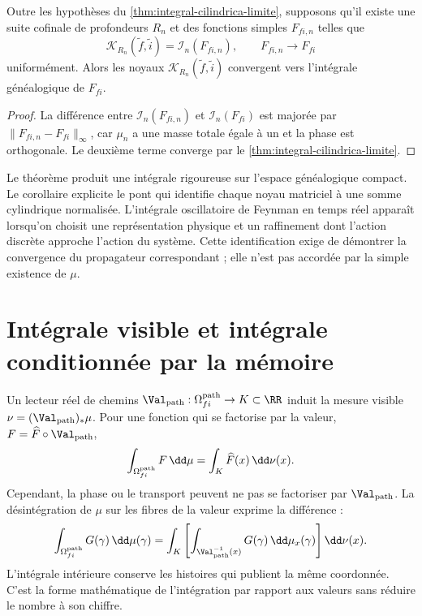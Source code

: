 \begin{corollary}
\label{cor:convergencia-kernels-discretos}
Outre les hypothèses du
\cref{thm:integral-cilindrica-limite}, supposons qu'il existe une suite
cofinale de profondeurs \(R_n\) et des fonctions simples \(F_{fi,n}\) telles que
\[
 \mathcal K_{R_n}(\widetilde f,\widetilde i)
 =\mathcal I_n(F_{fi,n}),
 \qquad
 F_{fi,n}\longrightarrow F_{fi}
\]
uniformément. Alors les noyaux
\(\mathcal K_{R_n}(\widetilde f,\widetilde i)\) convergent vers l'intégrale
généalogique de \(F_{fi}\).
\end{corollary}

\begin{proof}
La différence entre \(\mathcal I_n(F_{fi,n})\) et
\(\mathcal I_n(F_{fi})\) est majorée par
\(\|F_{fi,n}-F_{fi}\|_\infty\), car \(\mu_n\) a une masse totale égale à un et la
phase est orthogonale. Le deuxième terme converge par le
\cref{thm:integral-cilindrica-limite}.
\end{proof}

Le théorème produit une intégrale rigoureuse sur l'espace généalogique
compact. Le corollaire explicite le pont qui identifie chaque noyau
matriciel à une somme cylindrique normalisée. L'intégrale oscillatoire de
Feynman en temps réel apparaît lorsqu'on choisit
une représentation physique et un raffinement dont l'action discrète approche
l'action du système. Cette identification exige de démontrer la convergence du
propagateur correspondant ; elle n'est pas accordée par la simple existence de
\(\mu\).

\section{Intégrale visible et intégrale conditionnée par la mémoire}

Un lecteur réel de chemins
\(\Val_{\rm path}:\Omega_{fi}^{\rm path}\to K\subset\RR\) induit la mesure
visible \(\nu=(\Val_{\rm path})_*\mu\). Pour une fonction qui se factorise par la
valeur, \(F=\widehat F\circ\Val_{\rm path}\),
\[
 \int_{\Omega_{fi}^{\rm path}}F\,\dd\mu
 =\int_K\widehat F(x)\,\dd\nu(x).
\]
Cependant, la phase ou le transport peuvent ne pas se factoriser par
\(\Val_{\rm path}\). La
désintégration de \(\mu\) sur les fibres de la valeur exprime la différence :
\begin{equation}
 \int_{\Omega_{fi}^{\rm path}}G(\gamma)\,\dd\mu(\gamma)
 =\int_K
   \left[
    \int_{\Val_{\rm path}^{-1}(x)}G(\gamma)\,\dd\mu_x(\gamma)
   \right]\dd\nu(x).
 \label{eq:desintegracion-caminos}
\end{equation}
L'intégrale intérieure conserve les histoires qui publient la même coordonnée.
C'est la forme mathématique de l'intégration par rapport aux valeurs sans réduire le
nombre à son chiffre.

